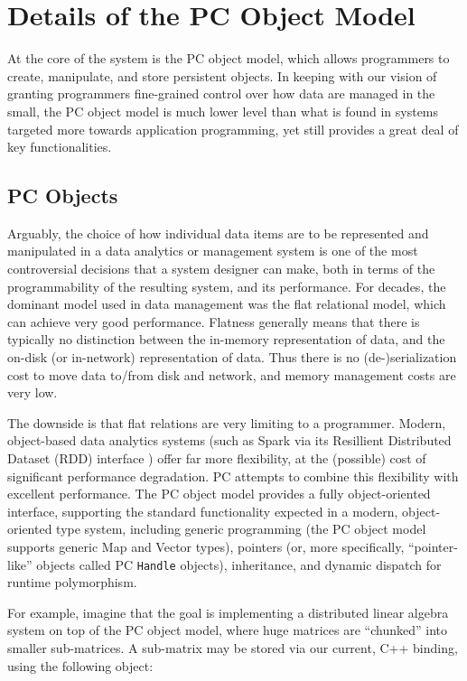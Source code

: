\section{Details of the PC Object Model} 
\label{sec:ObjectModel}

At the core of the system is the PC object model, which allows 
programmers to create, manipulate, and store persistent objects.
In keeping with our vision of granting programmers fine-grained control over how data are managed in the small, the PC object model
is much lower level than what is found in systems targeted more towards application programming, yet still provides a great deal of
key functionalities.

\subsection{PC Objects}

Arguably, the choice of how individual data items are to be represented and manipulated
in a data analytics or management system is one of the most
controversial decisions
that a system designer can make, both in terms of 
the programmability of the resulting system, and its performance.  For decades, the dominant model used in
data management was the flat relational model, which 
can achieve very good performance.
Flatness generally means 
that there is typically no distinction between the in-memory representation of data, and the on-disk (or in-network) representation of
data. Thus there is no (de-)serialization cost to move data to/from
disk and network, and memory management costs are very low. 

The downside is that flat relations are very limiting to a programmer.  Modern, object-based 
data analytics systems 
(such as Spark via its Resillient Distributed Dataset (RDD) interface \cite{zaharia2012resilient}) offer far more flexibility, at the (possible) cost of significant performance degradation.  
PC attempts to combine this flexibility with excellent performance.
The PC object model provides a fully object-oriented interface, supporting the standard functionality expected in a modern, object-oriented type system,
including generic programming (the PC object model supports generic Map and Vector types), pointers (or, more specifically,
``pointer-like'' objects called PC \texttt{Handle} objects), inheritance, and dynamic dispatch for runtime polymorphism.  

For example, imagine that the goal is implementing a distributed linear algebra system on top of the PC object model, where huge matrices are ``chunked'' into
smaller sub-matrices.  A sub-matrix may be stored via our current, C++ binding, using the following object:


